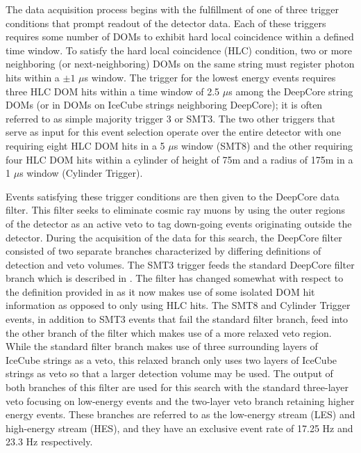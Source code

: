 \documentclass[manuscript]{aastex}
\begin{document}
The data acquisition process begins with the fulfillment of one of three trigger conditions that prompt readout of the detector data. Each of these triggers requires some number of DOMs to exhibit hard local coincidence within a defined time window. To satisfy the hard local coincidence (HLC) condition, two or more neighboring (or next-neighboring) DOMs on the same string must register photon hits within a $\pm1$ $\mu$s window. The trigger for the lowest energy events requires three HLC DOM hits within a time window of 2.5 $\mu$s among the DeepCore string DOMs (or in DOMs on IceCube strings neighboring DeepCore); it is often referred to as simple majority trigger 3 or SMT3. The two other triggers that serve as input for this event selection operate over the entire detector with one requiring eight HLC DOM hits in a 5 $\mu$s window (SMT8) and the other requiring four HLC DOM hits within a cylinder of height of 75m and a radius of 175m in a 1 $\mu$s window (Cylinder Trigger).

Events satisfying these trigger conditions are then given to the DeepCore data filter. This filter seeks to eliminate cosmic ray muons by using the outer regions of the detector as an active veto to tag down-going events originating outside the detector. During the acquisition of the data for this search, the DeepCore filter consisted of two separate branches characterized by differing definitions of detection and veto volumes. The SMT3 trigger feeds the standard DeepCore filter branch which is described in \cite{2012APh....35..615A}. The filter has changed somewhat with respect to the definition provided in \cite{2012APh....35..615A} as it now makes use of some isolated DOM hit information as opposed to only using HLC hits. The SMT8 and Cylinder Trigger events, in addition to SMT3 events that fail the standard filter branch, feed into the other branch of the filter which makes use of a more relaxed veto region. While the standard filter branch makes use of three surrounding layers of IceCube strings as a veto, this relaxed branch only uses two layers of IceCube strings as veto so that a larger detection volume may be used. The output of both branches of this filter are used for this search with the standard three-layer veto focusing on low-energy events and the two-layer veto branch retaining higher energy events. These branches are referred to as the low-energy stream (LES) and high-energy stream (HES), and they have an exclusive event rate of 17.25 Hz and 23.3 Hz respectively.
\end{document}
